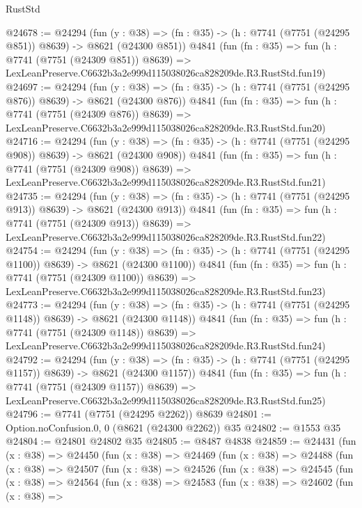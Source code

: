 \begin{lexlean}{RustStd}
\begin{coremodule}
@24678 := @24294
    (fun (y : @38) => (fn : @35) -> (h : @7741 (@7751 (@24295 @851)) @8639) -> @8621 (@24300 @851))
    @4841
    (fun (fn : @35) =>
    fun (h : @7741 (@7751 (@24309 @851)) @8639) =>
    LexLeanPreserve.C6632b3a2e999d115038026ca828209de.R3.RustStd.fun19)
@24697 := @24294
    (fun (y : @38) => (fn : @35) -> (h : @7741 (@7751 (@24295 @876)) @8639) -> @8621 (@24300 @876))
    @4841
    (fun (fn : @35) =>
    fun (h : @7741 (@7751 (@24309 @876)) @8639) =>
    LexLeanPreserve.C6632b3a2e999d115038026ca828209de.R3.RustStd.fun20)
@24716 := @24294
    (fun (y : @38) => (fn : @35) -> (h : @7741 (@7751 (@24295 @908)) @8639) -> @8621 (@24300 @908))
    @4841
    (fun (fn : @35) =>
    fun (h : @7741 (@7751 (@24309 @908)) @8639) =>
    LexLeanPreserve.C6632b3a2e999d115038026ca828209de.R3.RustStd.fun21)
@24735 := @24294
    (fun (y : @38) => (fn : @35) -> (h : @7741 (@7751 (@24295 @913)) @8639) -> @8621 (@24300 @913))
    @4841
    (fun (fn : @35) =>
    fun (h : @7741 (@7751 (@24309 @913)) @8639) =>
    LexLeanPreserve.C6632b3a2e999d115038026ca828209de.R3.RustStd.fun22)
@24754 := @24294
    (fun (y : @38) =>
    (fn : @35) -> (h : @7741 (@7751 (@24295 @1100)) @8639) -> @8621 (@24300 @1100))
    @4841
    (fun (fn : @35) =>
    fun (h : @7741 (@7751 (@24309 @1100)) @8639) =>
    LexLeanPreserve.C6632b3a2e999d115038026ca828209de.R3.RustStd.fun23)
@24773 := @24294
    (fun (y : @38) =>
    (fn : @35) -> (h : @7741 (@7751 (@24295 @1148)) @8639) -> @8621 (@24300 @1148))
    @4841
    (fun (fn : @35) =>
    fun (h : @7741 (@7751 (@24309 @1148)) @8639) =>
    LexLeanPreserve.C6632b3a2e999d115038026ca828209de.R3.RustStd.fun24)
@24792 := @24294
    (fun (y : @38) =>
    (fn : @35) -> (h : @7741 (@7751 (@24295 @1157)) @8639) -> @8621 (@24300 @1157))
    @4841
    (fun (fn : @35) =>
    fun (h : @7741 (@7751 (@24309 @1157)) @8639) =>
    LexLeanPreserve.C6632b3a2e999d115038026ca828209de.R3.RustStd.fun25)
@24796 := @7741 (@7751 (@24295 @2262)) @8639
@24801 := Option.noConfusion.{0, 0} (@8621 (@24300 @2262)) @35
@24802 := @1553 @35
@24804 := @24801 @24802 @35
@24805 := @8487 @4838
@24859 := @24431
    (fun (x : @38) =>
    @24450
      (fun (x : @38) =>
      @24469
        (fun (x : @38) =>
        @24488
          (fun (x : @38) =>
          @24507
            (fun (x : @38) =>
            @24526
              (fun (x : @38) =>
              @24545
                (fun (x : @38) =>
                @24564
                  (fun (x : @38) =>
                  @24583
                    (fun (x : @38) =>
                    @24602
                      (fun (x : @38) =>

\end{coremodule}
\end{lexlean}
